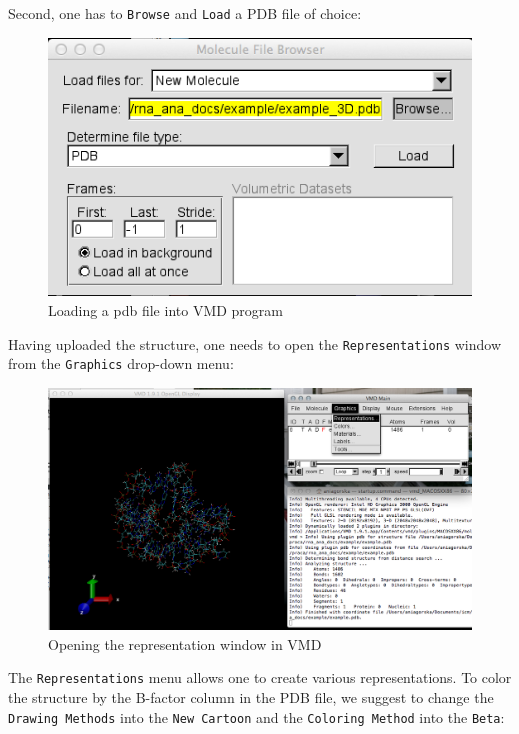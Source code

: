 \documentclass[12pt]{article}
\begin{document}
Second, one has to \texttt{Browse} and \texttt{Load} a PDB file of choice:
\begin{figure}[h!]
\centering
\includegraphics[scale=0.4]{./pictures/vmd2.png}
\caption{Loading a pdb file into VMD program}
\end{figure}
\newpage
Having uploaded the structure, one needs to open the \texttt{Representations} window from the \texttt{Graphics} drop-down menu:
\begin{figure}[h!]
\centering
\includegraphics[scale=0.4]{./pictures/vmd3.png}
\caption{Opening the representation window in VMD}
\end{figure}

The \texttt{Representations} menu allows one to create various representations. To color the structure by the B-factor column in the PDB file, we suggest to change the \texttt{Drawing Methods} into the \texttt{New Cartoon} and the \texttt{Coloring Method} into the \texttt{Beta}:
\end{document}
